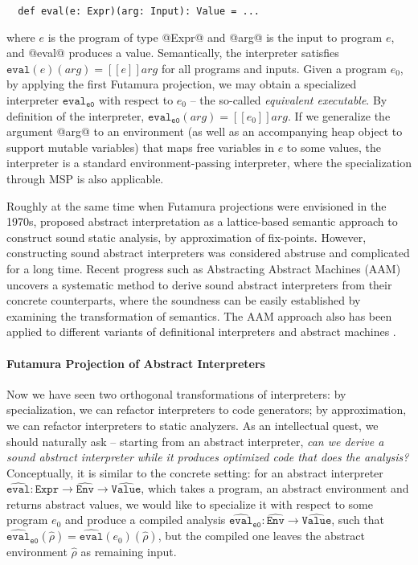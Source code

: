 \begin{lstlisting}
  def eval(e: Expr)(arg: Input): Value = ...
\end{lstlisting}

where $e$ is the program of type @Expr@ and @arg@ is the input to program $e$,
and @eval@ produces a value.
Semantically, the interpreter satisfies $ \texttt{eval}(e)(arg) = [\![ e ]\!] arg$ for all
programs and inputs. Given a program $e_0$, by applying the first Futamura
projection, we may obtain a specialized interpreter
$\texttt{eval}_{\texttt{e0}}$ with respect to $e_0$ -- the so-called \textit{equivalent executable}. 
By definition of the interpreter, 
$\texttt{eval}_{\texttt{e0}}(arg) = [\![ e_0 ]\!] arg $. If we generalize the
argument @arg@ to an environment (as well as an accompanying heap object to
support mutable variables) that maps free variables in $e$ to some
values, the interpreter is a standard environment-passing interpreter,
where the specialization through MSP is also applicable.

Roughly at the same time when Futamura projections were envisioned in the 1970s,
\citet{DBLP:conf/popl/CousotC77} proposed abstract interpretation as a
lattice-based semantic approach to construct sound static analysis, by
approximation of fix-points. However, constructing sound abstract interpreters
was considered abstruse and complicated for a long time.
Recent progress such as Abstracting Abstract Machines (AAM)
\cite{DBLP:conf/icfp/HornM10} uncovers a systematic method to derive sound
abstract interpreters from their concrete counterparts, where the soundness can
be easily established by examining the transformation of semantics. The AAM
approach also has been applied to different variants of definitional
interpreters and abstract machines \cite{DBLP:journals/jfp/HornM12,
DBLP:conf/icfp/HornM10, DBLP:journals/pacmpl/DaraisLNH17}.

\paragraph{Futamura Projection of Abstract Interpreters}

Now we have seen two orthogonal transformations of interpreters: by
specialization, we can refactor interpreters to code generators; by
approximation, we can refactor interpreters to static analyzers. As an
intellectual quest, we should naturally ask -- starting from an abstract
interpreter, \textit{can we derive a sound abstract interpreter while it
produces optimized code that does the analysis?}
Conceptually, it is similar to the concrete setting: for an
abstract interpreter $\widehat{\texttt{eval}}: \texttt{Expr} \to
\widehat{\texttt{Env}} \to \widehat{\texttt{Value}}$, which takes a program, an abstract
environment and returns abstract values, we would like to specialize it with
respect to some program $e_0$ and produce a compiled analysis
$\widehat{\texttt{eval}}_{\texttt{e0}} : \widehat{\texttt{Env}} \to
\widehat{\texttt{Value}}$, such that $
\widehat{\texttt{eval}}_{\texttt{e0}}(\widehat{\rho}) =
\widehat{\texttt{eval}}(e_0)(\widehat{\rho})$, but the compiled one leaves the
abstract environment $\widehat{\rho}$ as remaining input.

